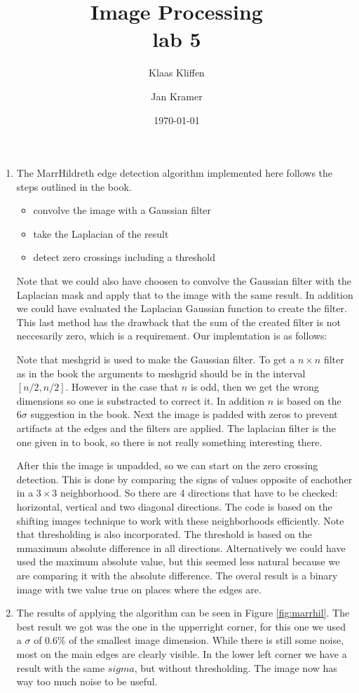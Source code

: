 \documentclass[a4paper]{article}
\title{\textsf{Image Processing \\ lab 5}}
\author{Klaas Kliffen \and Jan Kramer}
\date{\today}
\newcounter{exerciseCount}
\newcommand{\exercise}[1]{\addtocounter{exerciseCount}{1} \noindent \medskip {\large \textsf{\textbf{Exercise \arabic{exerciseCount} \--- #1}}} \par}
\begin{document}
\maketitle

\exercise{Edge detection}
\begin{enumerate}
\item
    The MarrHildreth edge detection algorithm implemented here follows the steps outlined in the book.
    \begin{itemize}
        \item convolve the image with a Gaussian filter
        \item take the Laplacian of the result
        \item detect zero crossings including a threshold
    \end{itemize}
    Note that we could also have choosen to convolve the Gaussian filter with the Laplacian mask and apply that to the image with the same result.
    In addition we could have evaluated the Laplacian Gaussian function to create the filter.
    This last method has the drawback that the sum of the created filter is not neccesarily zero, which is a requirement.
    Our implemtation is as follows:

    Note that meshgrid is used to make the Gaussian filter.
    To get a $n\times n$ filter as in the book the arguments to meshgrid should be in the interval $[n/2, n/2]$.
    However in the case that $n$ is odd, then we get the wrong dimensions so one is substracted to correct it.
    In addition $n$ is based on the $6\sigma$ suggestion in the book.
    Next the image is padded with zeros to prevent artifacts at the edges and the filters are applied.
    The laplacian filter is the one given in to book, so there is not really something interesting there.

    After this the image is unpadded, so we can start on the zero crossing detection.
    This is done by comparing the signs of values opposite of eachother in a $3\times 3$ neighborhood.
    So there are 4 directions that have to be checked: horizontal, vertical and two diagonal directions.
    The code is based on the shifting images technique to work with these neighborhoods efficiently.
    Note that thresholding is also incorporated.
    The threshold is based on the mmaximum absolute difference in all directions.
    Alternatively we could have used the maximum absolute value, but this seemed less natural because we are comparing it with the absolute difference.
    The overal result is a binary image with twe value true on places where the edges are.
\item
    The results of applying the algorithm can be seen in Figure \ref{fig:marrhil}.
    The best result we got was the one in the upperright corner, for this one we used a $\sigma$ of $0.6\%$ of the smallest image dimension.
    While there is still some noise, most on the main edges are clearly visible.
    In the lower left corner we have a result with the same $sigma$, but without thresholding.
    The image now has way too much noise to be useful.


\end{enumerate}
\end{document}
